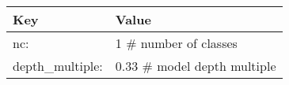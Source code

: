 \begin{table}
	\label{tab:yoloConfig}
	\begin{tabular}{|l|l|}
		\hline
		Key              & Value                                                                                                                                                                                                                                                                                                                                                                                                                                                                                                                                                                                                                                                                                                                                                                                                                                                                                                                                                                           \\ \hline
		nc:              & 1 \# number of classes                                                                                                                                                                                                                                                                                                                                                                                                                                                                                                                                                                                                                                                                                                                                                                                                                                                                                                                                                          \\ \hline
		depth\_multiple: & 0.33 \# model depth multiple                                                                                                                                                                                                                                                                                                                                                                                                                                                                                                                                                                                                                                                                                                                                                                                                                                                                                                                                                    \\ \hline

\end{tabular}
\end{table}
